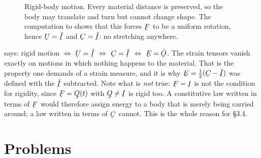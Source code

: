 \begin{figure}[htbp]\centering
{}
\caption{Rigid-body motion. Every material distance is
preserved, so the body may translate and turn but cannot change shape. The
computation  to  shows that this forces $\bF$ to be a
uniform rotation, hence $\bU=\hI$ and $\bC=\hI$: no stretching anywhere.}
\label{fig:37}
\end{figure}

\begin{remark}
\label{rem:rigidwhy}
 says: rigid motion $\iff$ $\bU=\hI$ $\iff$ $\bC=\hI$ $\iff$
$\bE=\hOb$. The strain tensors vanish exactly on motions in which nothing
happens to the material. That is the property one demands of a strain
measure, and it is why $\bE=\tfrac12(\bC-\hI)$ was defined with the $\hI$
subtracted. Note what is \emph{not} true: $\bF=\I$ is not the condition
for rigidity, since $\bF=\bQ(t)$ with $\bQ\neq\I$ is rigid too. A
constitutive law written in terms of $\bF$ would therefore assign energy
to a body that is merely being carried around; a law written in terms of
$\bC$ cannot. This is the whole reason for \S3.4.
\end{remark}

\setcounter{problemenv}{0}
\section{Problems}\label{sec:problems:c3}

